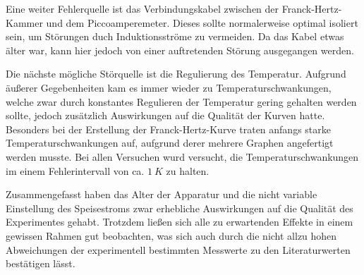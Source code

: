 Eine weiter Fehlerquelle ist das Verbindungskabel zwischen der Franck-Hertz-Kammer
und dem Piccoamperemeter. Dieses sollte normalerweise optimal isoliert sein, um
Störungen duch Induktionsströme zu vermeiden. Da das Kabel etwas älter war, kann
hier jedoch von einer auftretenden Störung ausgegangen werden.

Die nächste mögliche Störquelle ist die Regulierung des Temperatur. Aufgrund
äußerer Gegebenheiten kam es immer wieder zu Temperaturschwankungen, welche
zwar durch konstantes Regulieren der Temperatur gering gehalten werden sollte,
jedoch zusätzlich Auswirkungen auf die Qualität der Kurven hatte. Besonders bei
der Erstellung der Franck-Hertz-Kurve traten anfangs starke Temperaturschwankungen
auf, aufgrund derer mehrere Graphen angefertigt werden musste. Bei allen Versuchen
wurd versucht, die Temperaturschwankungen im einem Fehlerintervall von ca. $\SI{1}{K}$
zu halten.

Zusammengefasst haben das Alter der Apparatur und die nicht variable Einstellung
des Speisestroms zwar erhebliche Auswirkungen auf die Qualität des Experimentes
gehabt. Trotzdem ließen sich alle zu erwartenden Effekte in einem gewissen
Rahmen gut beobachten, was sich auch durch die nicht allzu hohen Abweichungen
der experimentell bestimmten Messwerte zu den Literaturwerten bestätigen lässt.
